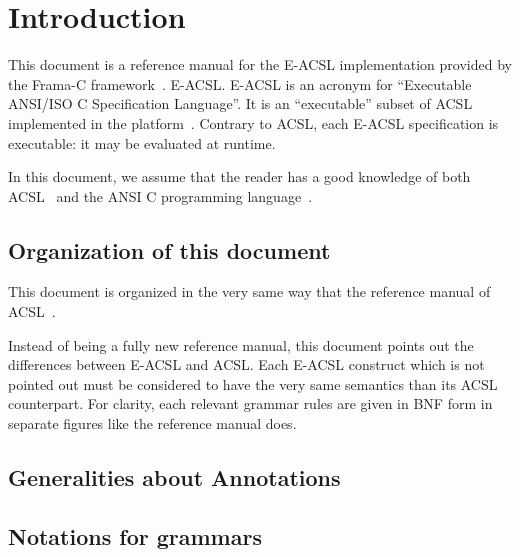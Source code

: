 \chapter{Introduction}

This document is a reference manual for
%
{the E-ACSL implementation provided by the Frama-C
  framework~\cite{frama-c}.}%
{E-ACSL.}
E-ACSL is an acronym for ``Executable ANSI/ISO C
Specification Language''. It is an ``executable'' subset of
ACSL~\cite{acsl} implemented in the \framac platform~\cite{framac}. Contrary to
ACSL, each E-ACSL specification is executable: it may be evaluated at runtime.

In this document, we assume that the reader has a good knowledge of both
ACSL~\cite{acsl} and the ANSI C programming language~\cite{KR88,standardc99}.

\section{Organization of this document}

This document is organized in the very same way that the reference manual of
ACSL~\cite{acsl}.

Instead of being a fully new reference manual, this document points out the
differences between E-ACSL and ACSL. Each E-ACSL construct which is not pointed
out must be considered to have the very same semantics than its ACSL
counterpart. For clarity, each relevant grammar rules are given in BNF form
in separate figures like the \acsl reference manual does.

\section{Generalities about Annotations}\label{sec:gener-about-annot}
\nodiff

\section{Notations for grammars}
\nodiff
